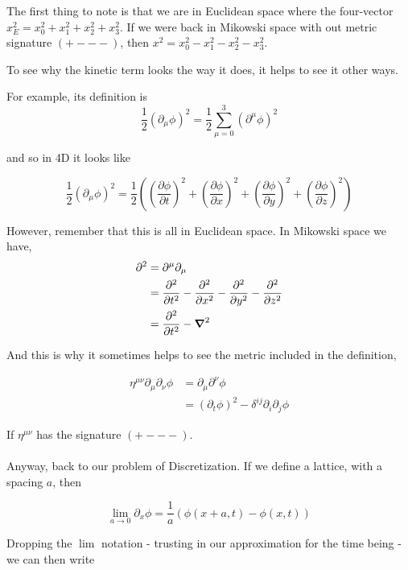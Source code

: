 The first thing to note is that we are in Euclidean space where the four-vector
$x_{E}^{2} = x_{0}^{2} + x_{1}^{2} + x_{2}^{2} + x_{3}^{2}$.
If we were back in Mikowski space with out metric signature $(+ - - -)$,
then $x^{2} = x_{0}^{2} - x_{1}^{2} - x_{2}^{2} - x_{3}^{2}$.

To see why the kinetic term looks the way it does, it helps to see it other ways.

For example, its definition is
$$
\frac{1}{2} (\partial_{\mu} \phi)^2 = \frac{1}{2} \sum_{\mu=0}^{3} (\partial^{\mu} \phi)^2
$$

and so in 4D it looks like

$$
\frac{1}{2} (\partial_{\mu} \phi)^2 =
\frac{1}{2} \left( 
    \left(\frac{\partial \phi}{\partial t}\right)^2 +
    \left(\frac{\partial \phi}{\partial x}\right)^2 +
    \left(\frac{\partial \phi}{\partial y}\right)^2 +
    \left(\frac{\partial \phi}{\partial z}\right)^2
\right)
$$

However, remember that this is all in Euclidean space.
In Mikowski space we have,
\begin{align*}
\partial^2 &= \partial^\mu \partial_\mu \\
&= \frac{\partial^2}{\partial t^2} - \frac{\partial^2}{\partial x^2} - \frac{\partial^2}{\partial y^2} - \frac{\partial^2}{\partial z^2} \\
&= \frac{\partial^2}{\partial t^2} - \boldsymbol{\mathbf{\nabla}}^2
\end{align*}

And this is why it sometimes helps to see the metric included in the definition,

\begin{align*}
\eta^{\mu\nu} \partial_\mu \partial_\nu \phi &= \partial_\mu \partial^\nu \phi \\
&= \left( \partial_t \phi \right)^2 - \delta^{ij} \partial_i \partial_j \phi
\end{align*}

If $\eta^{\mu\nu}$ has the signature $(+ - - -)$.
\\~\\

Anyway, back to our problem of Discretization.
If we define a lattice, with a spacing $a$, then


$$
\lim_{a \rightarrow 0} \partial_x \phi = \frac{1}{a} \left( \phi(x+a, t) - \phi(x, t) \right)
$$

Dropping the $\lim$ notation - trusting in our approximation for the time being - we can then write

